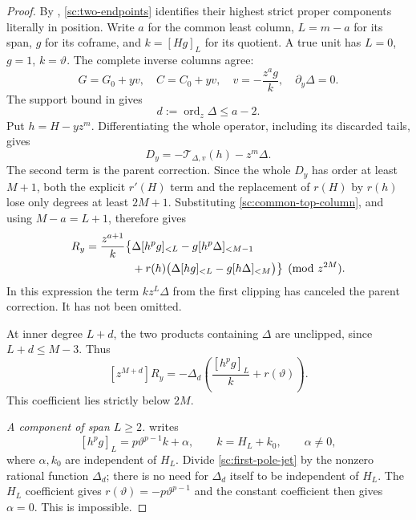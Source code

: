 \documentclass[11pt,a4paper]{amsart}
\numberwithin{equation}{section}
\theoremstyle{plain}
\theoremstyle{definition}
\newcommand{\ord}{\operatorname{ord}}
\begin{document}
\begin{proof}
By , \eqref{sc:two-endpoints} identifies their
highest strict proper components literally in position.  Write \(a\) for
the common least column, \(L=m-a\) for its span, \(g\) for its coframe,
and \(k=[Hg]_L\) for its quotient.  A true unit has \(L=0\), \(g=1\),
\(k=\vartheta\).  The complete inverse columns agree:
\begin{equation}\label{sc:common-top-column}
 G=G_0+yv,\quad C=C_0+yv,\quad
 v=-\frac{z^ag}{k},\quad \partial_y\Delta=0.
\end{equation}
The support bound in  gives
\begin{equation}\label{sc:needed-support}
 d:=\ord_z\Delta\le a-2.
\end{equation}
Put \(h=H-yz^m\).  Differentiating the whole operator, including its
discarded tails, gives
\[
 D_y=-\mathcal T_{\Delta,v}(h)-z^m\Delta.
\]
The second term is the parent correction.  Since the whole \(D_y\) has
order at least \(M+1\), both the explicit \(r'(H)\) term and the replacement
of \(r(H)\) by \(r(h)\) lose only degrees at least \(2M+1\).  Substituting
\eqref{sc:common-top-column}, and using \(M-a=L+1\), therefore gives
\begin{align}
 R_y=\frac{z^{a+1}}{k}\bigl\{&
   \Delta[h^pg]_{<L}-g[h^p\Delta]_{<M-1}\notag\\
 &+r(h)\bigl(\Delta[hg]_{<L}-g[h\Delta]_{<M}\bigr)
 \bigr\}\pmod {z^{2M}}.\label{sc:complete-pole-bracket}
\end{align}
In this expression the term \(kz^L\Delta\) from the first clipping has
canceled the parent correction.  It has not been omitted.

At inner degree \(L+d\), the two products containing \(\Delta\) are
unclipped, since \(L+d\le M-3\).  Thus
\begin{equation}\label{sc:first-pole-jet}
 [z^{M+d}]R_y
   =-\Delta_d\left(\frac{[h^pg]_L}{k}+r(\vartheta)\right).
\end{equation}
This coefficient lies strictly below \(2M\).

\smallskip\noindent\emph{A component of span \(L\ge2\).}
 writes
\[
 [h^pg]_L=p\vartheta^{p-1}k+\alpha,
 \qquad k=H_L+k_0,\qquad \alpha\ne0,
\]
where \(\alpha,k_0\) are independent of \(H_L\).  Divide
\eqref{sc:first-pole-jet} by the nonzero rational function \(\Delta_d\);
there is no need for \(\Delta_d\) itself to be independent of \(H_L\).
The \(H_L\) coefficient gives \(r(\vartheta)=-p\vartheta^{p-1}\) and the constant
coefficient then gives \(\alpha=0\).  This is impossible.


\end{proof}
\end{document}
